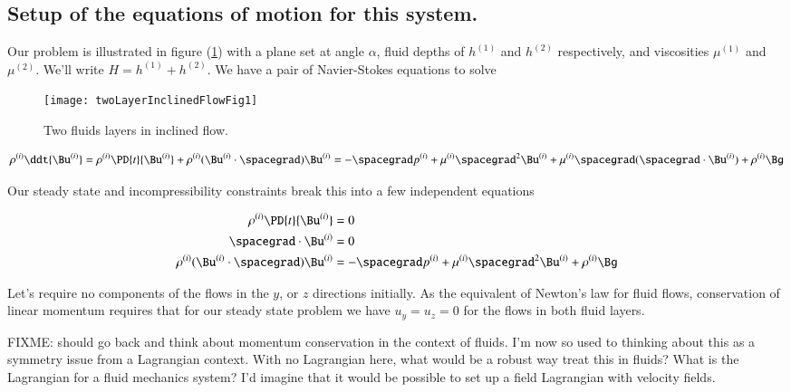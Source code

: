 \subsection{Setup of the equations of motion for this system.}

Our problem is illustrated in figure (\ref{fig:twoLayerInclinedFlowDifferentDensities:twoLayerInclinedFlowDifferentDensitiesFig1}) with a plane set at angle $\alpha$, fluid depths of $h^{(1)}$ and $h^{(2)}$ respectively, and viscosities $\mu^{(1)}$ and $\mu^{(2)}$.  We'll write $H = h^{(1)} + h^{(2)}$.  We have a pair of Navier-Stokes equations to solve

\begin{figure}[htp]
   \centering
   \texttt{[image: twoLayerInclinedFlowFig1]}
   \caption{Two fluids layers in inclined flow.}\label{fig:twoLayerInclinedFlowDifferentDensities:twoLayerInclinedFlowDifferentDensitiesFig1}
\end{figure}

\begin{equation}\label{eqn:twoLayerInclinedFlowDifferentDensities:10}
\rho^{(i)} \ddt{\Bu^{(i)}} = \rho^{(i)} \PD{t}{\Bu^{(i)}} + \rho^{(i)} (\Bu^{(i)} \cdot \spacegrad) \Bu^{(i)} = - \spacegrad p^{(i)} + \mu^{(i)} \spacegrad^2 \Bu^{(i)} + \mu^{(i)} \spacegrad (\spacegrad \cdot \Bu^{(i)}) + \rho^{(i)} \Bg
\end{equation}

Our steady state and incompressibility constraints break this into a few independent equations

\begin{align}\label{eqn:twoLayerInclinedFlowDifferentDensities:30}
\rho^{(i)} \PD{t}{\Bu^{(i)}} &= 0 \\
\spacegrad \cdot \Bu^{(i)} &= 0 \\
\rho^{(i)} (\Bu^{(i)} \cdot \spacegrad) \Bu^{(i)} &= - \spacegrad p^{(i)} + \mu^{(i)} \spacegrad^2 \Bu^{(i)} + \rho^{(i)} \Bg
\end{align}

Let's require no components of the flows in the $y$, or $z$ directions initially.  As the equivalent of Newton's law for fluid flows, conservation of linear momentum requires that for our steady state problem we have $u_y = u_z = 0$ for the flows in both fluid layers.  

FIXME: should go back and think about momentum conservation in the context of fluids.  I'm now so used to thinking about this as a symmetry issue from a Lagrangian context.  With no Lagrangian here, what would be a robust way treat this in fluids?  What is the Lagrangian for a fluid mechanics system?  I'd imagine that it would be possible to set up a field Lagrangian with velocity fields.

